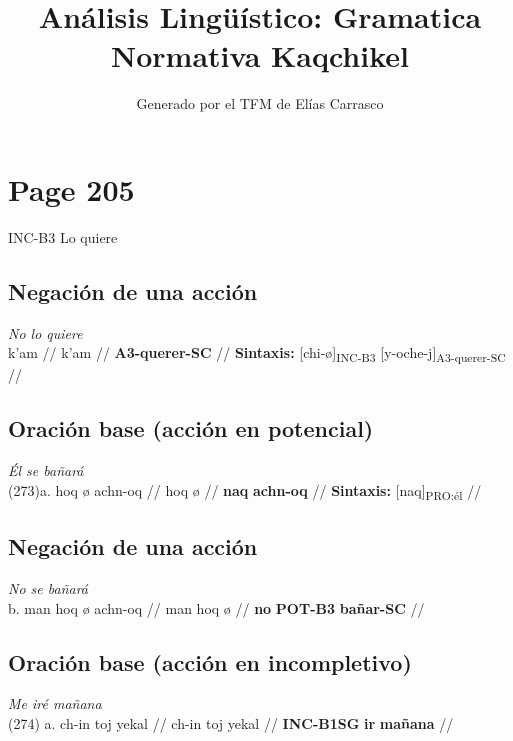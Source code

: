 \documentclass{article}%
\title{Análisis Lingüístico: Gramatica Normativa Kaqchikel}%
\author{Generado por el TFM de Elías Carrasco}%
\begin{document}
%
\normalsize%
\maketitle%
\section{Page 205}%
\label{sec:Page205}%
INC{-}B3 %
Lo quiere %
\subsection{Negación de una acción}%
\label{subsec:Negacindeunaaccin}%

%
\par\medskip%
\ex
\textit{No lo quiere} \\
\begingl
\gla k'am //
\glb k'am //
\glc \textbf{A3-querer-SC} //
\glft \textbf{Sintaxis:} [chi-ø]\textsubscript{INC-B3} [y-oche-j]\textsubscript{A3-querer-SC} //
\endgl
\xe
%
\medskip%
\subsection{Oración base (acción en potencial)}%
\label{subsec:Oracinbase(accinenpotencial)}%

%
\par\medskip%
\ex
\textit{Él se bañará} \\
\begingl
\gla (273)a. hoq ø achn-oq //
\glb hoq ø //
\glc \textbf{naq} \textbf{achn-oq} //
\glft \textbf{Sintaxis:} [naq]\textsubscript{PRO:él} //
\endgl
\xe
%
\medskip%
\subsection{Negación de una acción}%
\label{subsec:Negacindeunaaccin}%

%
\par\medskip%
\ex
\textit{No se bañará} \\
\begingl
\gla b. man hoq ø achn-oq //
\glb man hoq ø //
\glc \textbf{no} \textbf{POT-B3} \textbf{bañar-SC} //
\endgl
\xe
%
\medskip%
\subsection{Oración base (acción en incompletivo)}%
\label{subsec:Oracinbase(accinenincompletivo)}%

%
\par\medskip%
\ex
\textit{Me iré mañana} \\
\begingl
\gla (274) a. ch-in toj yekal //
\glb ch-in toj yekal //
\glc \textbf{INC-B1SG} \textbf{ir} \textbf{mañana} //
\endgl
\xe
%
\medskip%
\end{document}
